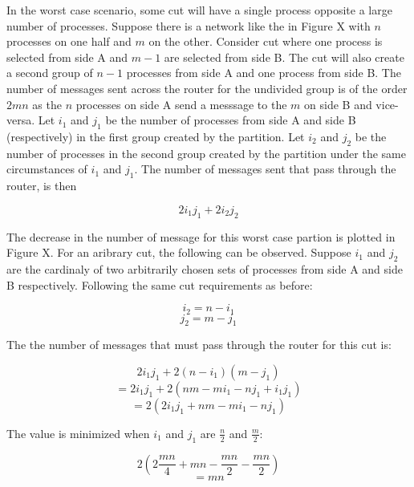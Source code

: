 In the worst case scenario, some cut will have a single process opposite a large number of processes.
Suppose there is a network like the in Figure X with $n$ processes on one half and $m$ on the other.
Consider cut where one process is selected from side A and $m-1$ are selected from side B.
The cut will also create a second group of $n-1$ processes from side A and one process from side B.
The number of messages sent across the router for the undivided group is of the order $2mn$ as the $n$ processes on side A send a messsage to the $m$ on side B and vice-versa.
Let $i_{1}$ and $j_{1}$ be the number of processes from side A and side B (respectively) in the first group created by the partition.
Let $i_{2}$ and $j_{2}$ be the number of processes in the second group created by the partition under the same circumstances of $i_1$ and $j_1$.
The number of messages sent that pass through the router, is then 

\begin{equation}
2 i_{1} j_{1} + 2 i_{2} j_{2}
\end{equation}

The decrease in the number of message for this worst case partion is plotted in Figure X.
For an aribrary cut, the following can be observed.
Suppose $i_{1}$ and $j_{2}$ are the cardinaly of two arbitrarily chosen sets of processes from side A and side B respectively.
Following the same cut requirements as before:

\begin{equation}
i_2 = n - i_1
\end{equation}
\begin{equation}
j_2 = m - j_1
\end{equation}

The the number of messages that must pass through the router for this cut is:

\begin{equation}
2 i_{1} j_{1} + 2 (n-i_{1}) (m-j_{1})
\end{equation}
\begin{equation}
= 2 i_{1} j_{1} + 2 (nm - mi_{1} - nj_{1} + i_{1}j_{1})
\end{equation}
\begin{equation}
= 2 (2 i_{1} j_{1} + nm - mi_{1} - nj_{1})
\end{equation}

The value is minimized when $i_1$ and $j_1$ are $\frac{n}{2}$ and $\frac{m}{2}$:

\begin{equation}
2( 2 \frac{mn}{4} + mn - \frac{mn}{2} - \frac{mn}{2})
\end{equation}
\begin{equation}
= mn
\end{equation}

